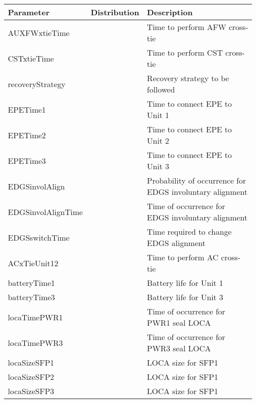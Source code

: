 \begin{table}
  \begin{center}
      \begin{tabular}{ | l | p{5cm} | p{5cm} |}
        \hline
         Parameter          & Distribution & Description                      \\ \hline \hline
         AUXFWxtieTime      &              & Time to perform AFW cross-tie    \\ \hline
         CSTxtieTime        &              & Time to perform CST cross-tie    \\ \hline
         recoveryStrategy   &              & Recovery strategy to be followed \\ \hline
         EPETime1           &              & Time to connect EPE to Unit 1    \\ \hline
         EPETime2           &              & Time to connect EPE to Unit 2    \\ \hline
         EPETime3           &              & Time to connect EPE to Unit 3    \\ \hline
         EDGSinvolAlign     &              & Probability of occurrence for EDGS involuntary alignment   \\ \hline
         EDGSinvolAlignTime &              & Time of occurrence for EDGS involuntary alignment          \\ \hline
         EDGSswitchTime     &              & Time required to change EDGS alignment  \\ \hline
         ACxTieUnit12       &              & Time to perform AC cross-tie     \\ \hline
         batteryTime1       &              & Battery life for Unit 1          \\ \hline
         batteryTime3       &              & Battery life for Unit 3          \\ \hline
         locaTimePWR1       &              & Time of occurrence for PWR1 seal LOCA   \\ \hline
         locaTimePWR3       &              & Time of occurrence for PWR3 seal LOCA   \\ \hline
         locaSizeSFP1       &              & LOCA size for SFP1               \\ \hline
         locaSizeSFP2       &              & LOCA size for SFP1               \\ \hline
         locaSizeSFP3       &              & LOCA size for SFP1               \\ \hline    

\end{tabular}
\end{center}
\end{table}
